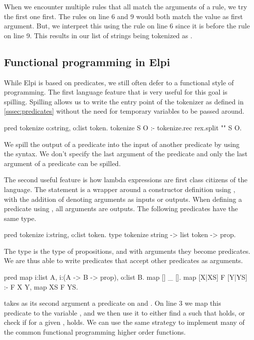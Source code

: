 \documentclass[thesis.tex]{subfiles}
\begin{document}
{{When we encounter multiple rules that all match the arguments of a rule, we try the first one first. The rules on line 6 and 9 would both match the value \elpii{["/", "/", "="]} as first argument. But, we interpret this using the rule on line 6 since it is before the rule on line 9. This results in our list of strings being tokenized as .

\subsection{Functional programming in Elpi}
While Elpi is based on predicates, we still often defer to a functional style of programming. The first language feature that is very useful for this goal is spilling. Spilling allows us to write the entry point of the tokenizer as defined in \cref{sssec:predicates} without the need for temporary variables to be passed around.
\begin{elpicode}
  pred tokenize o:string, o:list token.
  tokenize S O :- tokenize.rec {rex.split "" S} O.
\end{elpicode}

We spill the output of a predicate into the input of another predicate by using the \elpii{{ }} syntax. We don't specify the last argument of the predicate and only the last argument of a predicate can be spilled.

The second useful feature is how lambda expressions are first class citizens of the language. The  statement is a wrapper around a constructor definition using , with the addition of denoting arguments as inputs or outputs. When defining a predicate using , all arguments are outputs. The following predicates have the same type.
\begin{elpicode}
  pred tokenize i:string, o:list token.
  type tokenize string -> list token -> prop.
\end{elpicode}
The  type is the type of propositions, and with arguments they become predicates. We are thus able to write predicates that accept other predicates as arguments.
\begin{elpicode}
  pred map i:list A, i:(A -> B -> prop), o:list B.
  map [] _ [].
  map [X|XS] F [Y|YS] :- F X Y, map XS F YS.
\end{elpicode}
 takes as its second argument a predicate on  and . On line 3 we map this predicate to the variable , and we then use it to either find a  such that  holds, or check if for a given ,  holds. We can use the same strategy to implement many of the common functional programming higher order functions.

}}
\end{document}
